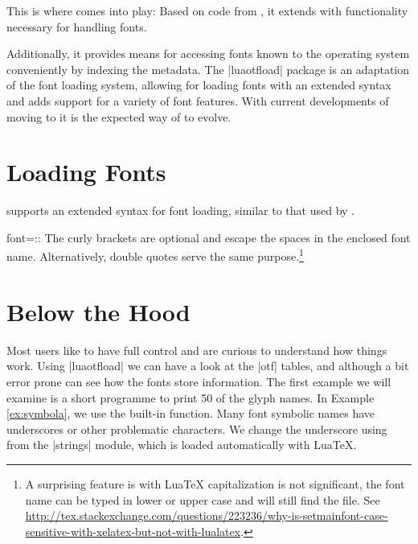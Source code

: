 {This is where  comes into play:
Based on code from \CONTEXT, it extends \LUATEX with functionality necessary
for handling \OpenType fonts.

Additionally, it provides means for accessing fonts known to the operating system conveniently by indexing the metadata. The |luaotfload| package is an adaptation of the \CONTEXT font loading system, allowing for loading \OpenType fonts with an extended syntax and adds support for a variety of font features. With current developments of moving \xetex to \luatex it is the expected way of \latex to evolve.

\section{Loading Fonts}

 supports an extended syntax for font loading, similar to that used by \xetex.



\begin{docCommand}{font}{=::}
The curly brackets are optional and escape the spaces in the enclosed
font name. Alternatively, double quotes serve the same purpose.\footnote{A surprising feature is with LuaTeX capitalization is not significant, the font name can be typed in lower or upper case and will still find the file. See \protect\url{http://tex.stackexchange.com/questions/223236/why-is-setmainfont-case-sensitive-with-xelatex-but-not-with-lualatex}.}
\end{docCommand}

\section{Below the Hood}

Most \tex users like to have full control and are curious to understand how things work. Using |luaotfload| we can have a look at the |otf| tables, and although a bit error prone can 
see how the fonts store information. The first example we will examine is a short programme to print 50 of the glyph names. In Example \ref{ex:symbola}, we use the built-in   function. Many font symbolic names have underscores or other problematic characters. We change the underscore using  from the |strings| module, which is loaded automatically with LuaTeX.


}
